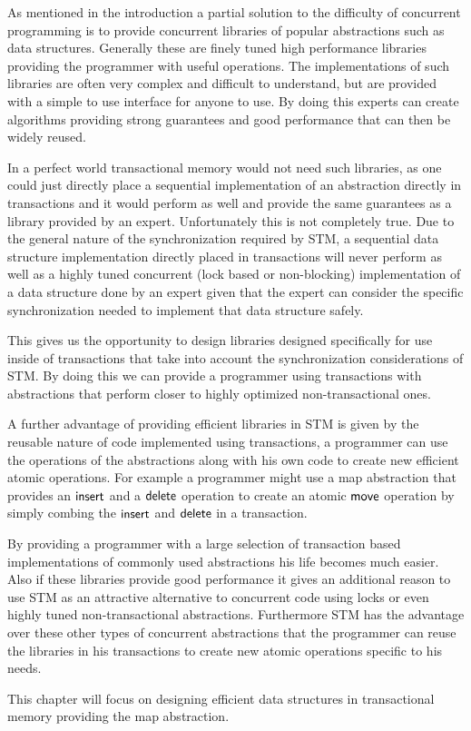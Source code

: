 
As mentioned in the introduction a partial solution to the difficulty of concurrent programming
is to provide concurrent libraries of popular abstractions such as data structures.
Generally these are finely tuned high performance libraries
providing the programmer with useful operations.
The implementations of such libraries are often very complex
and difficult to understand, but are provided with a simple to use
interface for anyone to use.
By doing this experts can create algorithms providing strong guarantees
and good performance that can then be widely reused.

In a perfect world transactional memory would not need such libraries,
as one could just directly place a sequential implementation of an abstraction
directly in transactions and it would perform as well and provide the same
guarantees as a library provided by an expert.
Unfortunately this is not completely true.
Due to the general nature
of the synchronization required by STM, a sequential data structure implementation directly
placed in transactions will never perform as well as a highly tuned concurrent
(lock based or non-blocking) implementation of a data structure done by an expert
given that the expert can consider the specific synchronization needed to implement
that data structure safely.

This gives us the opportunity to design libraries designed specifically for use inside
of transactions that take into account the synchronization considerations
of STM.
By doing this we can provide a programmer using transactions with abstractions that perform closer
to highly optimized non-transactional ones.

A further advantage of providing efficient libraries in STM is given by the reusable nature of code implemented using
transactions, a programmer can use the operations of the abstractions along with his own code
to create new efficient atomic operations.
For example a programmer might use a map abstraction that provides an $\lit{insert}$ and a $\lit{delete}$ operation
to create an atomic $\lit{move}$ operation by simply combing the $\lit{insert}$ and $\lit{delete}$ in a transaction.

By providing a programmer with a large selection of transaction based implementations of commonly used abstractions
his life becomes much easier.
Also if these libraries provide good performance it gives an additional reason to use STM as an attractive alternative to
concurrent code using locks or even highly tuned non-transactional abstractions.
Furthermore STM has the advantage over these other types of concurrent abstractions that the programmer can reuse
the libraries in his transactions to create new atomic operations specific to his needs.

This chapter will focus on designing efficient data structures in transactional memory providing the map abstraction.